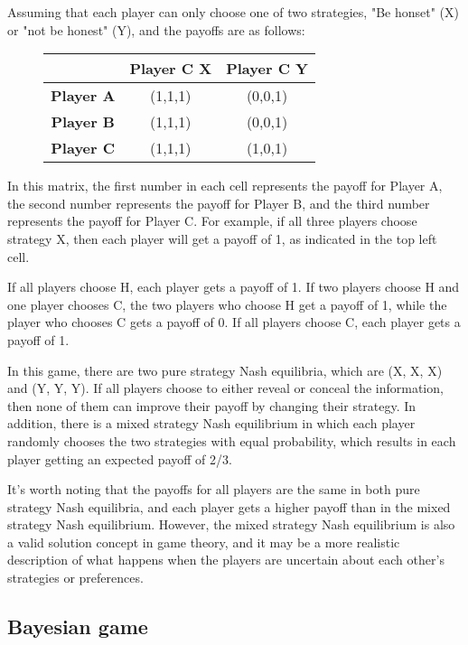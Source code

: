 \documentclass[twocolumn]{article}
\begin{document}
Assuming that each player can only choose one of two strategies, "Be honset" (X) or "not be honest" (Y), and the payoffs are as follows:

\begin{figure}[htbp]
\begin{tabular}{c|cc}
& \textbf{Player C X} & \textbf{Player C Y} \\
\hline
\textbf{Player A} & (1,1,1) & (0,0,1) \\
\textbf{Player B} & (1,1,1) & (0,0,1) \\
\textbf{Player C} & (1,1,1) & (1,0,1) \\
\end{tabular}
\end{figure}

In this matrix, the first number in each cell represents the payoff for Player A, the second number represents the payoff for Player B, and the third number represents the payoff for Player C. For example, if all three players choose strategy X, then each player will get a payoff of 1, as indicated in the top left cell.

If all players choose H, each player gets a payoff of 1. If two players choose H and one player chooses C, the two players who choose H get a payoff of 1, while the player who chooses C gets a payoff of 0. If all players choose C, each player gets a payoff of 1.

In this game, there are two pure strategy Nash equilibria, which are (X, X, X) and (Y, Y, Y). If all players choose to either reveal or conceal the information, then none of them can improve their payoff by changing their strategy. In addition, there is a mixed strategy Nash equilibrium in which each player randomly chooses the two strategies with equal probability, which results in each player getting an expected payoff of 2/3.

It's worth noting that the payoffs for all players are the same in both pure strategy Nash equilibria, and each player gets a higher payoff than in the mixed strategy Nash equilibrium. However, the mixed strategy Nash equilibrium is also a valid solution concept in game theory, and it may be a more realistic description of what happens when the players are uncertain about each other's strategies or preferences.


\subsection{Bayesian game}
\end{document}
